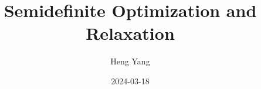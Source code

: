 \documentclass[
]{book}
\title{Semidefinite Optimization and Relaxation}
\author{Heng Yang}
\date{2024-03-18}
\theoremstyle{definition}
\theoremstyle{definition}
\theoremstyle{definition}
\theoremstyle{definition}
\theoremstyle{remark}
\begin{document}
\maketitle

{
\setcounter{tocdepth}{1}
\tableofcontents
}
\newcommand{\calG}{\mathcal{G}}
\newcommand{\calV}{\mathcal{V}}
\newcommand{\calE}{\mathcal{E}}
\newcommand{\calF}{\mathcal{F}}
\newcommand{\calQ}{\mathcal{Q}}
\newcommand{\calA}{\mathcal{A}}
\newcommand{\calK}{\mathcal{K}}
\newcommand{\calS}{\mathcal{S}}
\newcommand{\calM}{\mathcal{M}}
\newcommand{\calI}{\mathcal{I}}
\newcommand{\calR}{\mathcal{R}}
\newcommand{\calZ}{\mathcal{Z}}
\newcommand{\mathx}{\mathrm{x}}
\newcommand{\mathy}{\mathrm{y}}
\newcommand{\bbE}{\mathbb{E}}
\newcommand{\calN}{\mathcal{N}}
\newcommand{\tldR}{\tilde{R}}
\newcommand{\bbZ}{\mathbb{Z}}
\newcommand{\bbQ}{\mathbb{Q}}
\newcommand{\bbC}{\mathbb{C}}
\newcommand{\bbF}{\mathbb{F}}
\newcommand{\bbR}{\mathbb{R}}

\newcommand{\Real}[1]{\mathbb{R}^{#1}}
\newcommand{\Comp}[1]{\mathbb{C}^{#1}}
\newcommand{\sym}[1]{\mathbb{S}^{#1}}
\newcommand{\psd}[1]{\sym{#1}_{+}}
\newcommand{\pd}[1]{\sym{#1}_{++}}
\newcommand{\inprod}[2]{\langle #1, #2 \rangle}
\newcommand{\linprod}[2]{\left\langle #1, #2 \right\rangle}
\newcommand{\trace}{\mathrm{tr}}
\newcommand{\tran}{^\top}

\newcommand{\rank}{\mathrm{rank}}
\newcommand{\diag}{\mathrm{diag}}
\newcommand{\Diag}{\mathrm{Diag}}
\newcommand{\BlkDiag}{\mathrm{BlkDiag}}
\newcommand{\vectorize}{\mathrm{vec}}
\newcommand{\svec}{\mathrm{svec}}
\newcommand{\mat}{\mathrm{mat}}
\newcommand{\smat}{\mathrm{smat}}
\newcommand{\norm}[1]{\Vert #1 \Vert}
\newcommand{\lnorm}[1]{\left\Vert #1 \right\Vert}
\newcommand{\pnorm}[2]{\Vert #1 \Vert_{#2}}
\newcommand{\Fnorm}[1]{\Vert #1 \Vert_\mathrm{F}}
\newcommand{\conv}{\mathrm{conv}}
\newcommand{\cone}{\mathrm{cone}}
\newcommand{\interior}{\mathrm{int}}
\newcommand{\relint}{\mathrm{ri}}
\newcommand{\poly}[1]{\mathbb{R}[#1]}
\newcommand{\SOd}{\mathrm{SO}(d)}
\newcommand{\SOthree}{\mathrm{SO}(3)}
\newcommand{\Od}{\mathrm{O}(d)}
\newcommand{\Ogroup}{\mathrm{O}}
\newcommand{\usphere}{\mathcal{S}}
\newcommand{\bmath}[1]{\boldsymbol{#1}}
\newcommand{\lbrkt}{[\![}
\newcommand{\rbrkt}{]\!]}
\newcommand{\brkt}[1]{\lbrkt #1 \rbrkt}
\newcommand{\bracket}[1]{[ #1 ]}
\newcommand{\sign}{\mathrm{sgn}}
\end{document}
